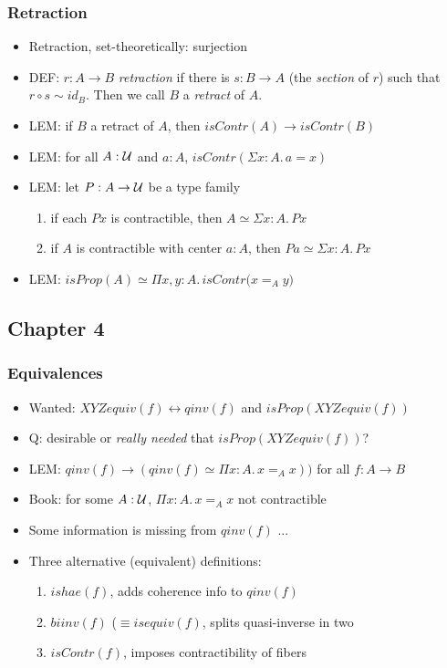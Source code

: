\documentclass[handout]{beamer}
\newcommand{\depi}[3]{\Pi{#1{:}#2.\,#3}}
\newcommand{\sigm}[3]{\Sigma{#1{:}#2.\,#3}}
\newcommand{\lra}{\leftrightarrow}
\newcommand{\UU}{{\cal U}}
\begin{document}
\frame
  {
  
    \frametitle{Retraction}

    \begin{itemize}[<+->]
    \item Retraction, set-theoretically: surjection
    \item DEF: $r:A\to B$ \emph{retraction} if there is $s:B\to A$ 
          (the \emph{section} of $r$) such that $r\circ s \sim id_B$.
          Then we call $B$ a \emph{retract} of $A$.
    \item LEM: if $B$ a retract of $A$, then $isContr(A)\to isContr(B)$
    \item LEM: for all $A:\UU$ and $a:A$, $isContr(\sigm{x}{A}{a=x})$
    \item LEM: let $P:A\to\UU$ be a type family
      \begin{enumerate}[<+->]   
      \item if each $Px$ is contractible, then $A\simeq \sigm{x}{A}{{Px}}$
      \item if $A$ is contractible with center $a:A$, then $Pa\simeq \sigm{x}{A}{{Px}}$
      \end{enumerate}   
    \item LEM: $isProp(A) \simeq \depi{x,y}{A}{isContr(x=_A y})$ 
    \end{itemize}
  }


  \subsection{Chapter 4}

\frame
  {
    \frametitle{Equivalences}

    \begin{itemize}[<+->]
    \item Wanted: $XYZequiv(f) \lra qinv(f)$ and $isProp(XYZequiv(f))$
    \item Q: desirable or \emph{really needed} that $isProp(XYZequiv(f))$?
    \item LEM: $qinv(f) \to (qinv(f) \simeq \depi{x}{A}{x=_A x}))$ for all $f:A\to B$
    \item Book: for some $A:\UU$, $ \depi{x}{A}{x=_A x}$ not contractible
    \item Some information is missing from $qinv(f)$ ...
    \item Three alternative (equivalent) definitions:
      \begin{enumerate}[<+->]
      \item $ishae(f)$, adds coherence info to  $qinv(f)$ 
      \item $biinv(f)$ (${}\equiv isequiv(f)$, splits quasi-inverse in two
      \item $isContr(f)$, imposes contractibility of fibers
      \end{enumerate}    
    \end{itemize}
  }
\end{document}
